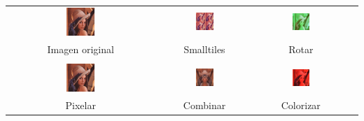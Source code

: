 \begin{center}
 \begin{tabular}{cccc}
   \includegraphics[width=0.2\textwidth]{imagenes/lena.png} &
   \includegraphics[width=0.2\textwidth]{imagenes/lena-smalltiles.png} &
   \includegraphics[width=0.2\textwidth]{imagenes/lena-rotar-canales.png} \\
   Imagen original & Smalltiles & Rotar \\
   \\
   \includegraphics[width=0.2\textwidth]{imagenes/lena-pixelar.png} &
   \includegraphics[width=0.2\textwidth]{imagenes/lena-combinar.png} &
   \includegraphics[width=0.2\textwidth]{imagenes/lena-colorizar.png} \\
   Pixelar & Combinar & Colorizar \\
 \end{tabular}
\end{center}

